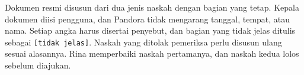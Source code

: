 \begin{rangkuman}
Dokumen resmi disusun dari dua jenis naskah dengan bagian yang tetap. Kepala dokumen diisi pengguna, dan Pandora tidak mengarang tanggal, tempat, atau nama. Setiap angka harus disertai penyebut, dan bagian yang tidak jelas ditulis sebagai \texttt{[tidak jelas]}. Naskah yang ditolak pemeriksa perlu disusun ulang sesuai alasannya. Rina memperbaiki naskah pertamanya, dan naskah kedua lolos sebelum diajukan.
\end{rangkuman}
